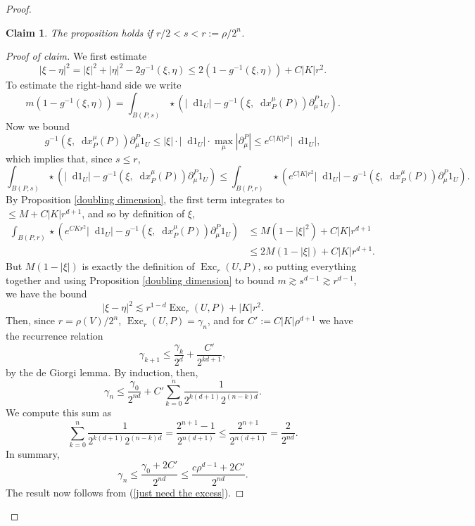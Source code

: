 \documentclass[reqno,10pt]{amsart}
\DeclareMathOperator{\Exc}{Exc}
\newcommand*\dif{\mathop{}\!\mathrm{d}}
\newtheorem{claim}{Claim}[theorem]
\theoremstyle{definition}
\numberwithin{equation}{section}
\begin{document}
\begin{proof}
\begin{claim}
The proposition holds if $r/2 < s < r := \rho/2^n$.
\end{claim}
\begin{proof}[Proof of claim]
We first estimate
$$|\xi - \eta|^2 = |\xi|^2 + |\eta|^2 - 2 g^{-1}(\xi, \eta) \leq 2(1 - g^{-1}(\xi, \eta)) + C|K|r^2.$$
To estimate the right-hand side we write 
$$m(1 - g^{-1}(\xi, \eta)) = \int_{B(P, s)} \star(|\dif 1_U| - g^{-1}(\xi, \dif x^\mu_P(P)) \partial^P_\mu 1_U).$$
Now we bound 
$$ g^{-1}(\xi, \dif x^\mu_P(P)) \partial^P_\mu 1_U \leq |\xi| \cdot |\dif 1_U| \cdot \max_\mu |\partial^P_\mu| \leq e^{C|K|r^2} |\dif 1_U|,$$
which implies that, since $s \leq r$,
$$\int_{B(P, s)} \star(|\dif 1_U| - g^{-1}(\xi, \dif x^\mu_P(P)) \partial^P_\mu 1_U) \leq \int_{B(P, r)} \star(e^{C|K|r^2} |\dif 1_U| - g^{-1}(\xi, \dif x^\mu_P(P)) \partial^P_\mu 1_U).$$
By Proposition \ref{doubling dimension}, the first term integrates to $\leq M + C|K|r^{d + 1}$, and so by definition of $\xi$,
\begin{align*}
\int_{B(P, r)} \star(e^{CKr^2} |\dif 1_U| - g^{-1}(\xi, \dif x^\mu_P(P)) \partial^P_\mu 1_U) &\leq M(1 - |\xi|^2) + C|K|r^{d + 1}\\
&\leq 2M(1 - |\xi|) + C|K|r^{d + 1}.
\end{align*}
But $M(1 - |\xi|)$ is exactly the definition of $\Exc_r(U, P)$, so putting everything together and using Proposition \ref{doubling dimension} to bound $m \gtrsim s^{d - 1} \gtrsim r^{d - 1}$, we have the bound 
\begin{equation}\label{just need the excess}
|\xi - \eta|^2 \lesssim r^{1 - d} \Exc_r(U, P) + |K|r^2.
\end{equation}
Then, since $r = \rho(V)/2^n$, $\Exc_r(U, P) = \gamma_n$, and for $C' := C|K|\rho^{d + 1}$ we have the recurrence relation 
$$\gamma_{k + 1} \leq \frac{\gamma_k}{2^d} + \frac{C'}{2^{k{d + 1}}},$$
by the de Giorgi lemma.
By induction, then,
$$\gamma_n \leq \frac{\gamma_0}{2^{nd}} + C' \sum_{k=0}^n \frac{1}{2^{k(d + 1)} 2^{(n - k)d}}.$$
We compute this sum as 
$$\sum_{k=0}^n \frac{1}{2^{k(d + 1)} 2^{(n - k)d}} = \frac{2^{n + 1} - 1}{2^{n(d + 1)}} \leq \frac{2^{n + 1}}{2^{n(d + 1)}} = \frac{2}{2^{nd}}.$$
In summary, 
$$\gamma_n \leq \frac{\gamma_0 + 2C'}{2^{nd}} \leq \frac{c\rho^{d - 1} + 2C'}{2^{nd}}.$$
The result now follows from (\ref{just need the excess}).
\end{proof}


\end{proof}
\end{document}
